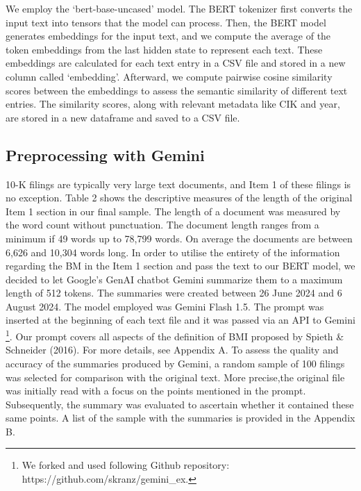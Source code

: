 \documentclass[
]{article}
\begin{document}
We employ the `bert-base-uncased' model. The BERT tokenizer first
converts the input text into tensors that the model can process. Then,
the BERT model generates embeddings for the input text, and we compute
the average of the token embeddings from the last hidden state to
represent each text. These embeddings are calculated for each text entry
in a CSV file and stored in a new column called `embedding'. Afterward,
we compute pairwise cosine similarity scores between the embeddings to
assess the semantic similarity of different text entries. The similarity
scores, along with relevant metadata like CIK and year, are stored in a
new dataframe and saved to a CSV file.

\subsection{Preprocessing with Gemini}\label{preprocessing-with-gemini}

10-K filings are typically very large text documents, and Item 1 of
these filings is no exception. Table 2 shows the descriptive measures of
the length of the original Item 1 section in our final sample. The
length of a document was measured by the word count without punctuation.
The document length ranges from a minimum if 49 words up to 78,799
words. On average the documents are between 6,626 and 10,304 words long.
In order to utilise the entirety of the information regarding the BM in
the Item 1 section and pass the text to our BERT model, we decided to
let Google's GenAI chatbot Gemini summarize them to a maximum length of
512 tokens. The summaries were created between 26 June 2024 and 6 August
2024. The model employed was Gemini Flash 1.5. The prompt was inserted
at the beginning of each text file and it was passed via an API to
Gemini \footnote{We forked and used following Github repository:
  https://github.com/skranz/gemini\_ex.}. Our prompt covers all aspects
of the definition of BMI proposed by Spieth \& Schneider (2016). For
more details, see Appendix A. To assess the quality and accuracy of the
summaries produced by Gemini, a random sample of 100 filings was
selected for comparison with the original text. More precise,the
original file was initially read with a focus on the points mentioned in
the prompt. Subsequently, the summary was evaluated to ascertain whether
it contained these same points. A list of the sample with the summaries
is provided in the Appendix B.
\end{document}

